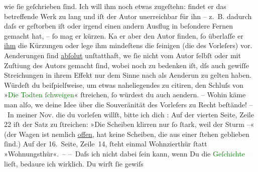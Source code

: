                wie ſie geſchrieben ſind. Ich will ihm noch etwas zugeſtehn: findet er das
               betreffende Werk zu lang und iſt der Autor unerreichbar für ihn – z. B. dadurch daſs
               er geſtorben iſt oder irgend einen andern Ausflug in {\pb}beſondere Fernen
               gemacht hat, – ſo mag er kürzen. Ka{\geminationn} er aber den Autor
               finden, ſo überlaſſe er \uline{ihm} die Kürzungen oder lege
               ihm mindeſtens die ſeinigen (die des Vorleſers) vor. Aenderungen ſind \uline{abſolut} unſtatthaft, we{\geminationn}{ }ſie nicht vom Autor ſelbſt oder mit Zuſti{\geminationm}ung des Autors gemacht ſind, wobei noch zu bedenken
               iſt, dſs auch gewiſſe Streichungen in ihrem Effekt nur dem {\pb}Sinne nach als
                  Aenderun zu gelten haben. Würdeſt du beiſpielſweise, um etwas naheliegendes zu
               citiren, den Schluſs von »\textcolor{green}{Die Todten ſchweigen}{}\ledrightnote{\textcolor{green}{Die Toten schweigen}}«
               ſtreichen, ſo würdest du auch aendern. – Wohin käme man \introOben{}alſo\introOben{}, we{\geminationn} deine Idee über die Souveränität des
               Vorleſers zu Recht beſtände!\pend
           \pstart
           – In meiner Nov. die du vorleſen willſt, bitte ich dich \label{K_L00740_1v}\label{K_L00740_1h}: Auf
               der vierten Seite, Zeile 22 iſt der Satz zu ſtreichen: »Die Scheiben klirren nur ſo
               ſtark, weil der Sturm –« (der Wagen ist nemlich \uline{offen}, hat keine {\pb}Scheiben, die aus einer \label{K_L00740_2v}\label{K_L00740_2h}{ }ſtehen geblieben ſind.) Auf der 16. Seite,
               Zeile 14, ſteht einmal Wohnzi{\geminationm}erthür ſtatt
               »Wohnungsthür«. –\pend
           \pstart
           – Daſs ich nicht dabei ſein kann, wenn Du die \textcolor{green}{Geſchichte}{} lieſt, bedaure ich wirklich. Du wirſt ſie gewiſs
